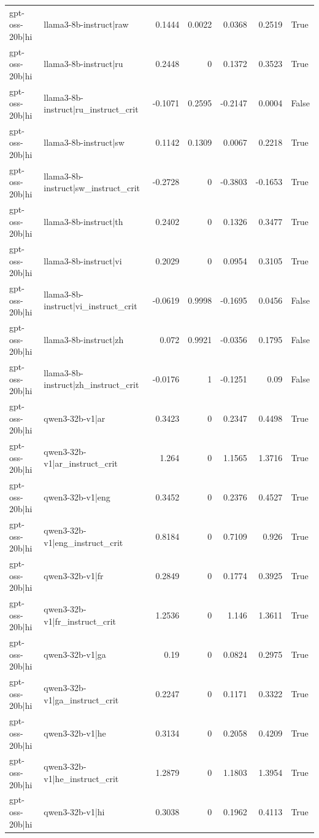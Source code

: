 \begin{table}
\begin{tabular}{l l r r r r l}
gpt-oss-20b|hi & llama3-8b-instruct|raw & 0.1444 & 0.0022 & 0.0368 & 0.2519 & True \\
gpt-oss-20b|hi & llama3-8b-instruct|ru & 0.2448 & 0 & 0.1372 & 0.3523 & True \\
gpt-oss-20b|hi & llama3-8b-instruct|ru_instruct_crit & -0.1071 & 0.2595 & -0.2147 & 0.0004 & False \\
gpt-oss-20b|hi & llama3-8b-instruct|sw & 0.1142 & 0.1309 & 0.0067 & 0.2218 & True \\
gpt-oss-20b|hi & llama3-8b-instruct|sw_instruct_crit & -0.2728 & 0 & -0.3803 & -0.1653 & True \\
gpt-oss-20b|hi & llama3-8b-instruct|th & 0.2402 & 0 & 0.1326 & 0.3477 & True \\
gpt-oss-20b|hi & llama3-8b-instruct|vi & 0.2029 & 0 & 0.0954 & 0.3105 & True \\
gpt-oss-20b|hi & llama3-8b-instruct|vi_instruct_crit & -0.0619 & 0.9998 & -0.1695 & 0.0456 & False \\
gpt-oss-20b|hi & llama3-8b-instruct|zh & 0.072 & 0.9921 & -0.0356 & 0.1795 & False \\
gpt-oss-20b|hi & llama3-8b-instruct|zh_instruct_crit & -0.0176 & 1 & -0.1251 & 0.09 & False \\
gpt-oss-20b|hi & qwen3-32b-v1|ar & 0.3423 & 0 & 0.2347 & 0.4498 & True \\
gpt-oss-20b|hi & qwen3-32b-v1|ar_instruct_crit & 1.264 & 0 & 1.1565 & 1.3716 & True \\
gpt-oss-20b|hi & qwen3-32b-v1|eng & 0.3452 & 0 & 0.2376 & 0.4527 & True \\
gpt-oss-20b|hi & qwen3-32b-v1|eng_instruct_crit & 0.8184 & 0 & 0.7109 & 0.926 & True \\
gpt-oss-20b|hi & qwen3-32b-v1|fr & 0.2849 & 0 & 0.1774 & 0.3925 & True \\
gpt-oss-20b|hi & qwen3-32b-v1|fr_instruct_crit & 1.2536 & 0 & 1.146 & 1.3611 & True \\
gpt-oss-20b|hi & qwen3-32b-v1|ga & 0.19 & 0 & 0.0824 & 0.2975 & True \\
gpt-oss-20b|hi & qwen3-32b-v1|ga_instruct_crit & 0.2247 & 0 & 0.1171 & 0.3322 & True \\
gpt-oss-20b|hi & qwen3-32b-v1|he & 0.3134 & 0 & 0.2058 & 0.4209 & True \\
gpt-oss-20b|hi & qwen3-32b-v1|he_instruct_crit & 1.2879 & 0 & 1.1803 & 1.3954 & True \\
gpt-oss-20b|hi & qwen3-32b-v1|hi & 0.3038 & 0 & 0.1962 & 0.4113 & True \\

\end{tabular}
\end{table}
